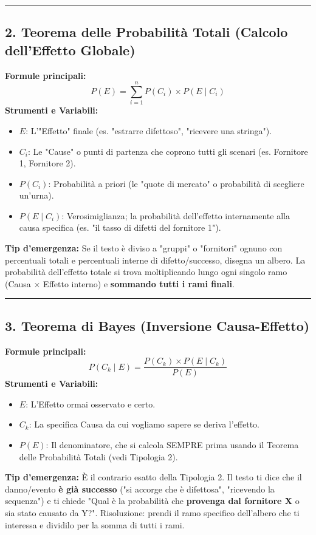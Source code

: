 \documentclass[12pt, a4paper]{article}
\begin{document}
\vspace{0.3cm}\hrule\vspace{0.3cm}

\subsection*{2. Teorema delle Probabilità Totali (Calcolo dell'Effetto Globale)}
\textbf{Formule principali:}
$$ P(E) = \sum_{i=1}^{n} P(C_i) \times P(E \mid C_i) $$
\textbf{Strumenti e Variabili:}
\begin{itemize}
    \item $E$: L'"Effetto" finale (es. "estrarre difettoso", "ricevere una stringa").
    \item $C_i$: Le "Cause" o punti di partenza che coprono tutti gli scenari (es. Fornitore 1, Fornitore 2).
    \item $P(C_i)$: Probabilità a priori (le "quote di mercato" o probabilità di scegliere un'urna).
    \item $P(E \mid C_i)$: Verosimiglianza; la probabilità dell'effetto internamente alla causa specifica (es. "il tasso di difetti del fornitore 1").
\end{itemize}
\textbf{Tip d'emergenza:} Se il testo è diviso a "gruppi" o "fornitori" ognuno con percentuali totali e percentuali interne di difetto/successo, disegna un albero. La probabilità dell'effetto totale si trova moltiplicando lungo ogni singolo ramo (Causa $\times$ Effetto interno) e \textbf{sommando tutti i rami finali}.

\vspace{0.3cm}\hrule\vspace{0.3cm}

\subsection*{3. Teorema di Bayes (Inversione Causa-Effetto)}
\textbf{Formule principali:}
$$ P(C_k \mid E) = \frac{P(C_k) \times P(E \mid C_k)}{P(E)} $$
\textbf{Strumenti e Variabili:}
\begin{itemize}
    \item $E$: L'Effetto ormai osservato e certo.
    \item $C_k$: La specifica Causa da cui vogliamo sapere se deriva l'effetto.
    \item $P(E)$: Il denominatore, che si calcola SEMPRE prima usando il Teorema delle Probabilità Totali (vedi Tipologia 2).
\end{itemize}
\textbf{Tip d'emergenza:} È il contrario esatto della Tipologia 2. Il testo ti dice che il danno/evento \textbf{è già successo} ("si accorge che è difettosa", "ricevendo la sequenza") e ti chiede "Qual è la probabilità che \textbf{provenga dal fornitore X} o sia stato causato da Y?". Risoluzione: prendi il ramo specifico dell'albero che ti interessa e dividilo per la somma di tutti i rami.
\end{document}
